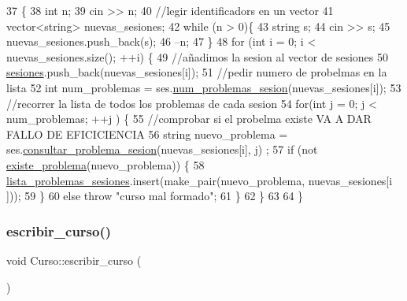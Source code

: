 \begin{DoxyCode}
37                                          \{
38   \textcolor{keywordtype}{int} n;
39   cin >> n;
40   \textcolor{comment}{//legir identificadors en un vector}
41   vector<string> nuevas\_sesiones;
42   \textcolor{keywordflow}{while} (n > 0)\{
43     \textcolor{keywordtype}{string} s;
44     cin >> s;
45     nuevas\_sesiones.push\_back(s);
46      --n;
47   \}
48   \textcolor{keywordflow}{for} (\textcolor{keywordtype}{int} i = 0; i < nuevas\_sesiones.size(); ++i) \{
49     \textcolor{comment}{//añadimos la sesion al vector de sesiones}
50     \mbox{\hyperlink{class_curso_a53e0e57eb6d683a83752082d633a03bc}{sesiones}}.push\_back(nuevas\_sesiones[i]);
51     \textcolor{comment}{//pedir numero de probelmas en la lista}
52     \textcolor{keywordtype}{int} num\_problemas = ses.\mbox{\hyperlink{class_cjt__sesion_ac761936095af984ee9a39fdcdf25219c}{num\_problemas\_sesion}}(nuevas\_sesiones[i]);
53     \textcolor{comment}{//recorrer la lista de todos los problemas de cada sesion}
54     \textcolor{keywordflow}{for}(\textcolor{keywordtype}{int} j = 0; j < num\_problemas; ++j ) \{
55       \textcolor{comment}{//comprobar si el probelma existe VA A DAR FALLO DE EFICICIENCIA}
56       \textcolor{keywordtype}{string} nuevo\_problema = ses.\mbox{\hyperlink{class_cjt__sesion_a7bc8395d0f4702cd383b11efab65feb1}{consultar\_problema\_sesion}}(nuevas\_sesiones[i], j)
      ;
57       \textcolor{keywordflow}{if} (not \mbox{\hyperlink{class_curso_ac697ad831382b4e3ccd85365e835344f}{existe\_problema}}(nuevo\_problema)) \{
58         \mbox{\hyperlink{class_curso_a99375622457c06d91cdeede8686f6da5}{lista\_problemas\_sesiones}}.insert(make\_pair(nuevo\_problema, nuevas\_sesiones[i
      ]));
59       \}
60       \textcolor{keywordflow}{else} \textcolor{keywordflow}{throw} \textcolor{stringliteral}{"curso mal formado"};
61     \}
62   \}
63 
64 \}
\end{DoxyCode}
\mbox{\label{class_curso_ac196f3a5a5d30d41d2c0a0c295f052d3}} 
\subsubsection{\texorpdfstring{escribir\+\_\+curso()}{escribir\_curso()}}
{\footnotesize\ttfamily void Curso\+::escribir\+\_\+curso (\begin{DoxyParamCaption}{ }\end{DoxyParamCaption})}



